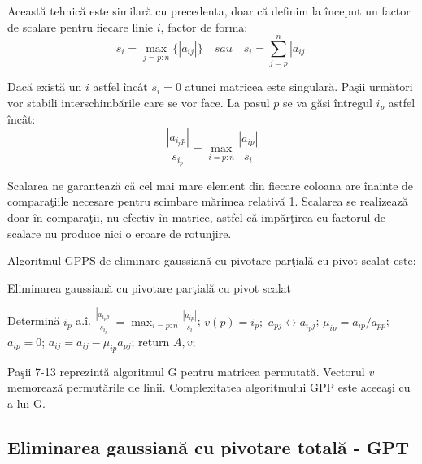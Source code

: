 \documentclass{exam}
\begin{document}
\par Aceast\u{a} tehnic\u{a} este similar\u{a} cu precedenta, doar c\u{a} definim la \^{i}nceput un factor de scalare pentru fiecare linie $i$, factor de forma:
$$s_i = \max_{j=p:n}{\{|a_{ij}|\}} \quad sau \quad s_i = \sum_{j=p}^n{|a_{ij}|}$$

\par Dac\u{a} exist\u{a} un $i$ astfel \^{i}nc\^{a}t $s_i = 0$ atunci matricea este singular\u{a}. Pa\c{s}ii urm\u{a}tori vor stabili interschimb\u{a}rile care se vor face. La pasul $p$ se va g\u{a}si  \^{i}ntregul $i_p$ astfel \^{i}nc\^{a}t:
$$\frac{|a_{i_p p}|}{s_{i_p}} = \max_{i=p:n}{\frac{|a_{i p}|}{s_i}}$$

\par Scalarea ne garanteaz\u{a} c\u{a} cel mai mare element din fiecare coloana are \^{i}nainte de compara\c{t}iile necesare pentru scimbare m\u{a}rimea relativ\u{a} 1. Scalarea se realizeaz\u{a} doar \^{i}n compara\c{t}ii, nu efectiv \^{i}n matrice, astfel c\u{a} imp\u{a}r\c{t}irea cu factorul de scalare nu produce nici o eroare
de rotunjire.

Algoritmul GPPS de eliminare gaussian\u{a} cu pivotare par\c{t}ial\u{a} cu pivot scalat este:

\begin{algorithm}[H]
	\caption{Eliminarea gaussian\u{a} cu pivotare par\c{t}ial\u{a} cu pivot scalat}
	\label{gpps}
	\begin{algorithmic}[1]
		\State Determin\u{a} $i_p$ a.î. $\frac{|a_{i_p p}|}{s_{i_p}} = \max_{i=p:n}{\frac{|a_{i p}|}{s_i}}$; $v(p) = i_p;$
		\State $a_{pj} \leftrightarrow a_{i_p j}$;
		\EndFor
		\State $\mu_{ip} = a_{ip}/a_{pp}$;
		\State $a_{ip} = 0$;
		\State $a_{ij} = a_{ij} - \mu_{ip} a_{pj}$;
		\EndFor
		\EndFor
		\EndFor
		\State return $A, v$;
		\EndProcedure
	\end{algorithmic}
\end{algorithm}
Pa\c{s}ii 7-13 reprezint\u{a} algoritmul G pentru matricea permutat\u{a}. Vectorul $v$ memoreaz\u{a} permut\u{a}rile de linii. Complexitatea algoritmului GPP este aceea\c{s}i cu a lui G.


\subsection{Eliminarea gaussian\u{a} cu pivotare total\u{a} - GPT}
\end{document}

